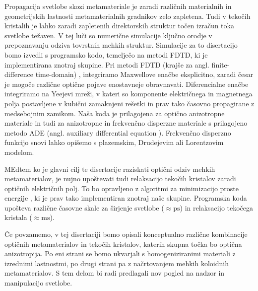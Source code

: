 \documentclass[a4paper,11pt]{article}
\begin{document}

Propagacija svetlobe skozi metamateriale je zaradi različnih materialnih in geometrijskih lastnosti metamaterialnih gradnikov zelo zapletena. 
Tudi v tekočih kristalih je lahko zaradi zapletenih direktorskih struktur točen izračun toka svetlobe težaven. 
V tej luči so numerične simulacije ključno orodje v prepoznavanju odziva tovrstnih mehkih struktur. 
Simulacije za to disertacijo bomo izvedli s programsko kodo, temelječo na metodi FDTD, ki je implementirana znotraj skupine. 
Pri metodi FDTD (krajše za angl. finite-difference time-domain) \cite{taflove1}, integriramo Maxwellove enačbe eksplicitno, zaradi česar je mogoče različne optične pojave enostavneje obravnavati. 
Diferencialne enačbe integriramo na Yeejevi mreži, v kateri so komponente električnega in magnetnega polja postavljene v kubični zamaknjeni rešetki in prav tako časovno propagirane z medsebojnim zamikom. 
Naša koda je prilagojena za optično anizotropne materiale in tudi za anizotropne in frekvenčno disperzne materiale s prilagojeno metodo ADE (angl. auxiliary differential equation \cite{taflove1}). 
Frekvenčno disperzno funkcijo snovi lahko opišemo s plazemskim, Drudejevim ali Lorentzovim modelom. 

MEdtem ko je glavni cilj te disertacije raziskati optični odziv mehkih metamaterialov, je nujno upoštevati tudi relaksacijo tekočih kristalov zaradi optičnih električnih polj. 
To bo opravljeno z algoritmi za minimizacijo proste energije \cite{ravnik-2009-lc-modelling}, ki je prav tako implementiran znotraj naše skupine. 
Programska koda upošteva različne časovne skale za širjenje svetlobe ($\approx \mathrm{ps}$) in relaksacijo tekočega kristala ($\approx \mathrm{ms}$). 

Če povzamemo, v tej disertaciji bomo opisali konceptualno različne kombinacije optičnih metamaterialov in tekočih kristalov, katerih skupna točka bo optična anizotropija. 
Po eni strani se bomo ukvarjali s homogeniziranimi materiali z izrednimi lastnostmi, po drugi strani pa z načrtovanjem mehkih koloidnih metamaterialov. 
S tem delom bi radi predlagali nov pogled na nadzor in manipulacijo svetlobe. 



\end{document}

